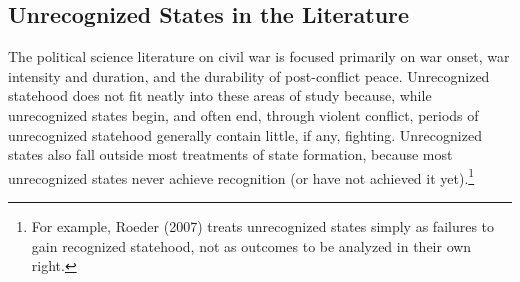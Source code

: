 \documentclass[11pt,letterpaper, notitlepage]{article}
\begin{document}
\subsection{Unrecognized States in the Literature}

The political science literature on civil war is focused primarily on war onset, %
war intensity and duration, %
and the durability of post-conflict peace. %
Unrecognized statehood does not fit neatly into these areas of study because, while unrecognized states begin, and often end, through violent conflict, periods of unrecognized statehood generally contain little, if any, fighting. Unrecognized states also fall outside most treatments of state formation, because most unrecognized states never achieve recognition (or have not achieved it yet).\footnote{For example, Roeder (2007) treats unrecognized states simply as failures to gain recognized statehood, not as outcomes to be analyzed in their own right.}  
\end{document}
